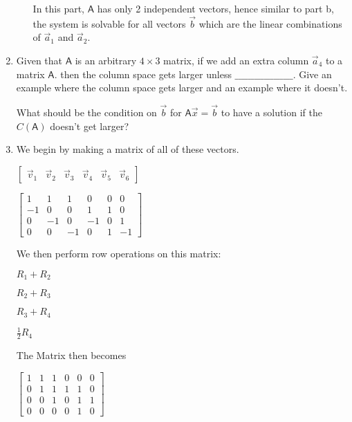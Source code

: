 \documentclass[a4paper, 11pt]{article}
\newcommand{\mat}[1]{\boldsymbol { \mathsf{#1}} }
\begin{document}
\begin{enumerate}
\begin{enumerate}
In this part, $\mat A$ has only 2 independent vectors, hence similar to part b, the system is solvable for all vectors $\vec b$ which are the linear combinations of $\vec a_1$ and $\vec a_2$.

\end{enumerate}

\item Given that $\mat A$ is an arbitrary $4 \times 3$ matrix, if we add an extra column $\vec a_4$ to a matrix $\mat A$. then the column space gets larger unless $\_ \_ \_\_ \_ \_\_ \_ \_\_ \_ \_\_ \_ \_\_ \_ \_$. Give an example where the column space gets larger and an example where it doesn't. 

What should be the condition on $\vec b$ for $\mat A \vec x = \vec b$ to have a solution if the $C(\mat A)$ doesn't get larger?  

\item We begin by making a matrix of all of these vectors. 

\begin{center}

$
\begin{bmatrix}
\vec v_1 & \vec v_2 & \vec v_3 & \vec v_4 & \vec v_5 & \vec v_6  
\end{bmatrix}
$

$
\begin{bmatrix}
1 & 1 & 1 & 0 & 0 & 0 \\
-1 & 0 & 0 & 1 & 1 & 0\\
0 & -1 & 0 & -1 & 0 & 1\\ 
0 & 0 & -1 & 0 & 1 & -1 
\end{bmatrix}
$

\end{center}

We then perform row operations on this matrix:
\begin{center}
$R_1 + R_2$

$R_2 + R_3$

$R_3 + R_4$

$\frac{1}{2} R_4$
\end{center}

The Matrix then becomes 

\begin{center}
$
\begin{bmatrix}
1 & 1 & 1 & 0 & 0 & 0 \\
0 & 1 & 1 & 1 & 1 & 0\\
0 & 0 & 1 & 0 & 1 & 1\\ 
0 & 0 & 0 & 0 & 1 & 0 
\end{bmatrix}
$
\end{center}


\end{enumerate}
\end{document}
